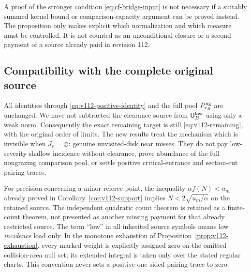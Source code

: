 A proof of the stronger condition \eqref{eq:cf-bridge-input} is not
necessary if a suitably summed kernel bound or comparison-capacity
argument can be proved instead. The proposition only makes explicit
which normalization and which measure must be controlled. It is not
counted as an unconditional closure or a second payment of a source
already paid in revision 112.

\subsection{Compatibility with the complete original source}
All identities through \eqref{eq:v112-positive-identity} and the full
pool $P_{r_B}^{\rm ng}$ are unchanged. We have not subtracted the
clearance source from $\mathsf U_B^{\rm low}$ using only a weak norm.
Consequently the exact remaining target is still
\eqref{eq:v112-remaining}, with the original order of limits.
The new results treat the mechanism which is invisible when
$J_\varepsilon=\varnothing$: genuine unvisited-disk near misses.
They do not pay low-severity shallow incidence without clearance,
prove abundance of the full nongrazing comparison pool, or settle
positive critical-entrance and section-cut pairing traces.

For precision concerning a minor referee point, the inequality
$\alpha f(N)<u_m$ already proved in
Corollary~\ref{cor:v112-support} implies
$N<2\sqrt{u_m/\alpha}$ on the retained source. The independent
quadratic count theorem is retained as a finite-count theorem, not
presented as another missing payment for that already restricted
source. The term ``low'' in all inherited source symbols means low
\emph{incidence} load only. In the monotone exhaustion of
Proposition~\ref{prop:v112-exhaustion}, every marked weight is
explicitly assigned zero on the omitted collision-area null set;
its extended integral is taken only over the stated regular charts.
This convention never sets a positive one-sided pairing trace to zero.
